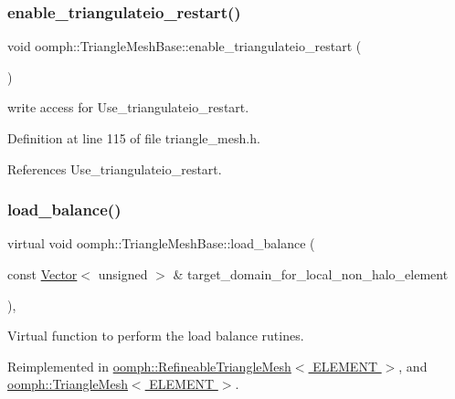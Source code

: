 \subsubsection{\texorpdfstring{enable\+\_\+triangulateio\+\_\+restart()}{enable\_triangulateio\_restart()}}
{\footnotesize\ttfamily void oomph\+::\+Triangle\+Mesh\+Base\+::enable\+\_\+triangulateio\+\_\+restart (\begin{DoxyParamCaption}{ }\end{DoxyParamCaption})\hspace{0.3cm}{\ttfamily [inline]}}



write access for Use\+\_\+triangulateio\+\_\+restart. 



Definition at line 115 of file triangle\+\_\+mesh.\+h.



References Use\+\_\+triangulateio\+\_\+restart.

\mbox{\label{classoomph_1_1TriangleMeshBase_ad6e2c45db7c67e5a6fd063f0ea9bbfe7}} 
\subsubsection{\texorpdfstring{load\+\_\+balance()}{load\_balance()}}
{\footnotesize\ttfamily virtual void oomph\+::\+Triangle\+Mesh\+Base\+::load\+\_\+balance (\begin{DoxyParamCaption}\item[{const \hyperlink{classoomph_1_1Vector}{Vector}$<$ unsigned $>$ \&}]{target\+\_\+domain\+\_\+for\+\_\+local\+\_\+non\+\_\+halo\+\_\+element }\end{DoxyParamCaption})\hspace{0.3cm}{\ttfamily [inline]}, {\ttfamily [virtual]}}



Virtual function to perform the load balance rutines. 



Reimplemented in \hyperlink{classoomph_1_1RefineableTriangleMesh_aaffa40b7d036f8ed8639bf9396f1088a}{oomph\+::\+Refineable\+Triangle\+Mesh$<$ E\+L\+E\+M\+E\+N\+T $>$}, and \hyperlink{classoomph_1_1TriangleMesh_a712bfd68d4b55e9c475347c0146fc8ac}{oomph\+::\+Triangle\+Mesh$<$ E\+L\+E\+M\+E\+N\+T $>$}.



